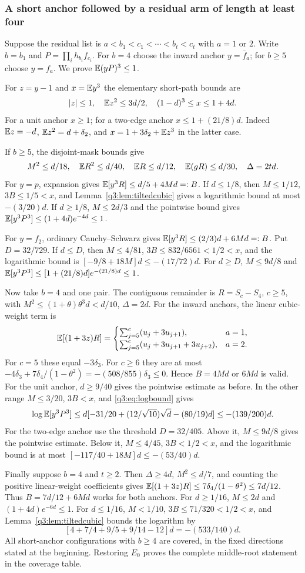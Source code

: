 \subsubsection{A short anchor followed by a residual arm of length at least four}
Suppose the residual list is $a<b_1<c_1<\cdots<b_t<c_t$ with $a=1$ or $2$. Write $b=b_1$ and $P=\prod_{i} h_{b_i}f_{c_i}$. For $b=4$ choose the inward anchor $y=\bar f_a$; for $b\ge5$ choose $y=f_a$. We prove $\mathbb E(yP)^3\le1$.

For $z=y-1$ and $x=\mathbb E y^3$ the elementary short-path bounds are
\[
 |z|\le1,\quad \mathbb E z^2\le3d/2,\quad
 (1-d)^3\le x\le1+4d.
\]
For a unit anchor $x\ge1$; for a two-edge anchor $x\le1+(21/8)d$. Indeed $\mathbb E z=-d$, $\mathbb E z^2=d+\delta_{2}$, and $x=1+3\delta_{2}+\mathbb E z^3$ in the latter case.

If $b\ge5$, the disjoint-mask bounds give
\[
 M^2\le d/18,\quad \mathbb E R^2\le d/40,\quad
 \mathbb E R\le d/12,\quad \mathbb E(gR)\le d/30,\quad \Delta=2td.
\]
For $y=p$, expansion gives $\mathbb E[y^3R]\le d/5+4Md=:B$. If $d\le1/8$, then $M\le1/12$, $3B\le1/5<x$, and Lemma~\ref{q3:lem:tiltedcubic} gives a logarithmic bound at most $-(3/20)d$. If $d\ge1/8$, $M\le2d/3$ and the pointwise bound gives
$\mathbb E[y^3P^3]\le(1+4d)e^{-4d}\le1$.

For $y=f_2$, ordinary Cauchy--Schwarz gives
$\mathbb E[y^3R]\le(2/3)d+6Md=:B$. Put $D=32/729$. If $d\le D$, then $M\le4/81$, $3B\le832/6561<1/2<x$, and the logarithmic bound is
$[-9/8+18M]d\le-(17/72)d$. For $d\ge D$, $M\le9d/8$ and
$\mathbb E[y^3P^3]\le[1+(21/8)d]e^{-(21/8)d}\le1$.

Now take $b=4$ and one pair. The contiguous remainder is $R=S_c-S_4$, $c\ge5$, with $M^2\le(1+\theta)\theta^3d<d/10$, $\Delta=2d$. For the inward anchors, the linear cubic-weight term is
\[
 \mathbb E[(1+3z)R]=
 \begin{cases}
 \sum_{j=5}^c(u_j+3u_{j+1}),&a=1,\\
 \sum_{j=5}^c(u_j+3u_{j+1}+3u_{j+2}),&a=2.
 \end{cases}
\]
For $c=5$ these equal $-3\delta_{3}$. For $c\ge6$ they are at most
$-4\delta_{3}+7\delta_{4}/(1-\theta^2)=-(508/855)\delta_{3}\le0$. Hence $B=4Md$ or $6Md$ is valid.
For the unit anchor, $d\ge9/40$ gives the pointwise estimate as before. In the other range $M\le3/20$, $3B<x$, and \eqref{q3:eq:logbound} gives
\[
 \log\mathbb E[y^3P^3]\le d[-31/20+(12/\sqrt{10})\sqrt d-(80/19)d]
 \le-(139/200)d.
\]
For the two-edge anchor use the threshold $D=32/405$. Above it, $M\le9d/8$ gives the pointwise estimate. Below it, $M\le4/45$, $3B<1/2<x$, and the logarithmic bound is at most $[-117/40+18M]d\le-(53/40)d$.

Finally suppose $b=4$ and $t\ge2$. Then $\Delta\ge4d$, $M^2\le d/7$, and counting the positive linear-weight coefficients gives
$\mathbb E[(1+3z)R]\le7\delta_{4}/(1-\theta^2)\le7d/12$. Thus $B=7d/12+6Md$ works for both anchors.
For $d\ge1/16$, $M\le2d$ and $(1+4d)e^{-6d}\le1$. For $d\le1/16$, $M<1/10$, $3B\le71/320<1/2<x$, and Lemma~\ref{q3:lem:tiltedcubic} bounds the logarithm by
\[
 [4+7/4+9/5+9/14-12]d=-(533/140)d.
\]
All short-anchor configurations with $b\ge4$ are covered, in the fixed directions stated at the beginning. Restoring $E_0$ proves the complete middle-root statement in the coverage table.
